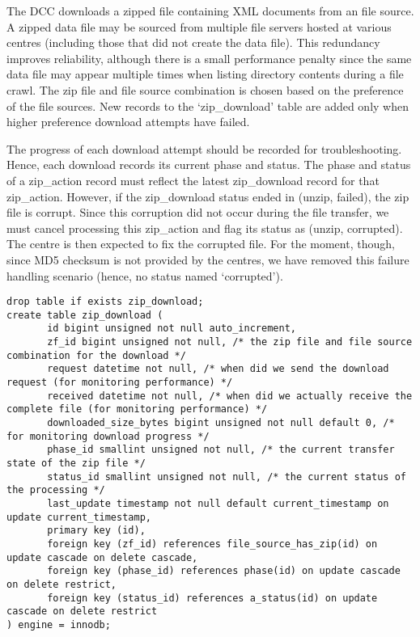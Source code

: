 \documentclass[a4paper,11pt]{article}
\begin{document}
\begin{landscape}
The DCC downloads a zipped file containing XML documents from an file source. A zipped data file may be sourced from multiple file servers hosted at various centres (including those that did not create the data file). This redundancy improves reliability, although there is a small performance penalty since the same data file may appear multiple times when listing directory contents during a file crawl. The zip file and file source combination is chosen based on the preference of the file sources. New records to the `zip\_download' table are added only when higher preference download attempts have failed.

The progress of each download attempt should be recorded for troubleshooting. Hence, each download records its current phase and status. The phase and status of a zip\_action record must reflect the latest zip\_download record for that zip\_action. However, if the zip\_download status ended in (unzip, failed), the zip file is corrupt. Since this corruption did not occur during the file transfer, we must cancel processing this zip\_action and flag its status as (unzip, corrupted). The centre is then expected to fix the corrupted file. For the moment, though, since MD5 checksum is not provided by the centres, we have removed this failure handling scenario (hence, no status named `corrupted').

\begin{Verbatim}[fontsize=\small,formatcom=\color{blue}]
drop table if exists zip_download;
create table zip_download (
       id bigint unsigned not null auto_increment,
       zf_id bigint unsigned not null, /* the zip file and file source combination for the download */
       request datetime not null, /* when did we send the download request (for monitoring performance) */
       received datetime not null, /* when did we actually receive the complete file (for monitoring performance) */
       downloaded_size_bytes bigint unsigned not null default 0, /* for monitoring download progress */
       phase_id smallint unsigned not null, /* the current transfer state of the zip file */
       status_id smallint unsigned not null, /* the current status of the processing */
       last_update timestamp not null default current_timestamp on update current_timestamp,
       primary key (id),
       foreign key (zf_id) references file_source_has_zip(id) on update cascade on delete cascade,
       foreign key (phase_id) references phase(id) on update cascade on delete restrict,
       foreign key (status_id) references a_status(id) on update cascade on delete restrict
) engine = innodb;
\end{Verbatim}


\end{landscape}
\end{document}
